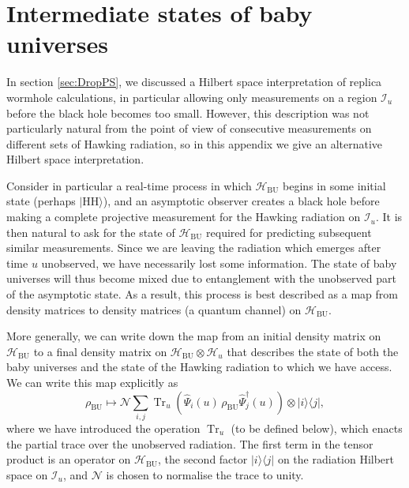 \documentclass[letterpaper,12pt]{article}
\newcommand*{\hilb}{\mathcal{H}}	%
\newcommand*{\hbu}{\mathcal{H}_\text{BU}} %
\DeclareMathOperator{\Tr}{Tr}
\newcommand*{\scri}{\mathscr{I}} %
\newcommand{\HH}{\mathrm{HH}} %
\begin{document}
\section{Intermediate states of baby universes}
\label{sec:RWBUE}

In section \ref{sec:DropPS}, we discussed a Hilbert space interpretation of replica wormhole calculations, in particular allowing only measurements on a region $\scri_u$ before the black hole becomes too small. However, this description was not particularly natural from the point of view of consecutive measurements on different sets of Hawking radiation, so in this appendix we give an alternative Hilbert space interpretation.

Consider in particular a real-time process in which $\hbu$ begins in some initial state (perhaps $|\HH\rangle$), and an asymptotic observer creates a black hole before making a complete projective measurement for the Hawking radiation on $\scri_u$. It is then natural to ask for the state of $\hbu$ required for predicting subsequent similar measurements. Since we are leaving the radiation which emerges after time $u$ unobserved, we have necessarily lost some information.  The state of baby universes will thus become mixed due to entanglement with the unobserved part of the asymptotic state.  As a result, this process is best described as a map from density matrices to density matrices (a quantum channel) on $\hbu$.

More generally, we can write down the map from an initial density matrix on $\hbu$ to a final density matrix on $\hbu\otimes \hilb_u$ that describes the state of both the baby universes and the state of the Hawking radiation to which we have access. We can write this map explicitly as
\begin{equation}
\label{eq:QC}
	\rho_\mathrm{BU} \mapsto  \mathcal{N} \sum_{i,j} \Tr_u(\hat{\Psi}_i(u) \, \rho_\mathrm{BU} \hat{\Psi}_j^\dag(u)) \otimes |i\rangle\langle j|,
\end{equation}
where we have introduced the operation $\Tr_u$ (to be defined below), which enacts the partial trace over the unobserved radiation. The first term in the tensor product is an operator on $\hbu$, the second factor $|i\rangle\langle j|$ on the radiation Hilbert space on $\scri_u$, and $\mathcal{N}$ is chosen to normalise the trace to unity.
\end{document}
